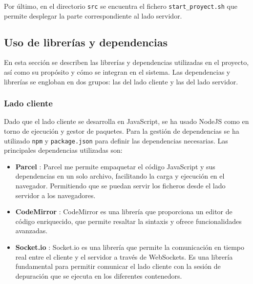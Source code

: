Por último, en el directorio \texttt{src} se encuentra el fichero \texttt{start\_proyect.sh} que permite desplegar la parte correspondiente al lado servidor. 

\subsection{Uso de librerías y dependencias} \label{subsec:uso_librerias_dependencias}

En esta sección se describen las librerías y dependencias utilizadas en el proyecto, así como su propósito y cómo se integran en el sistema. Las dependencias y librerías se engloban en dos grupos: las del lado cliente y las del lado servidor.

\subsubsection{Lado cliente}
Dado que el lado cliente se desarrolla en JavaScript, se ha usado NodeJS como en torno de ejecución y gestor de paquetes. Para la gestión de dependencias se ha utilizado \texttt{npm} y \texttt{package.json} para definir las dependencias necesarias.
Las principales dependencias utilizadas son:
\begin{itemize}
    \item \textbf{Parcel} \cite{parcel}: Parcel me permite empaquetar el código JavaScript y sus dependencias en un solo archivo, facilitando la carga y ejecución en el navegador. Permitiendo que se puedan servir los ficheros desde el lado servidor a los navegadores.
    \item \textbf{CodeMirror} \cite{codemirror}: CodeMirror es una librería que proporciona un editor de código enriquecido, que permite resaltar la sintaxis y ofrece funcionalidades avanzadas.
    \item \textbf{Socket.io} \cite{socket.io}: Socket.io es una librería que permite la comunicación en tiempo real entre el cliente y el servidor a través de WebSockets. Es una librería fundamental para permitir comunicar el lado cliente con la sesión de depuración que se ejecuta en los diferentes \glspl{contenedor}.
\end{itemize}

